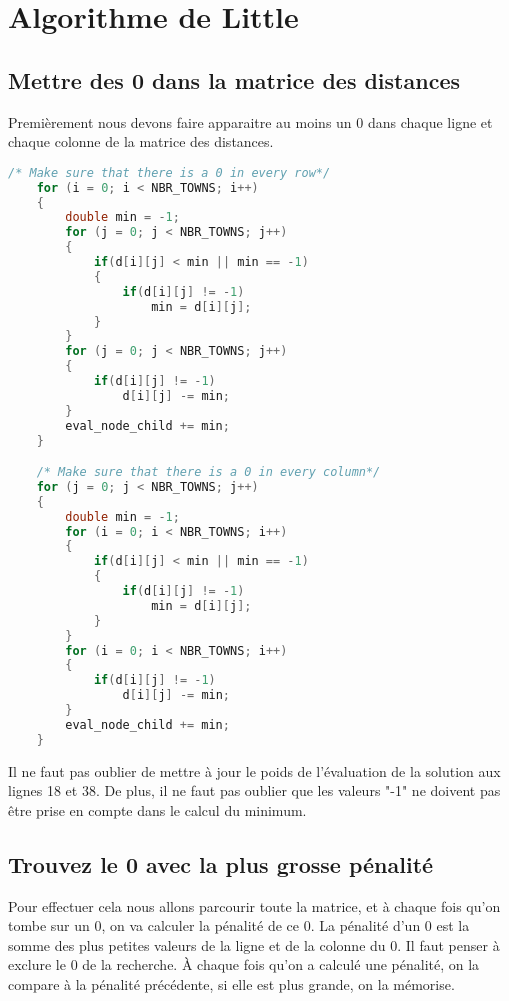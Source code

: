 \documentclass[11pt]{article}
\begin{document}
\section{Algorithme de Little}

\subsection{Mettre des 0 dans la matrice des distances}

Premièrement nous devons faire apparaitre au moins un 0 dans chaque ligne et chaque colonne de la matrice des distances.

\begin{lstlisting}[language=C]
    /* Make sure that there is a 0 in every row*/
    for (i = 0; i < NBR_TOWNS; i++)
    {
        double min = -1;
        for (j = 0; j < NBR_TOWNS; j++)
        {
            if(d[i][j] < min || min == -1)
            {
                if(d[i][j] != -1)
                    min = d[i][j];
            }
        }
        for (j = 0; j < NBR_TOWNS; j++)
        {
            if(d[i][j] != -1)
                d[i][j] -= min;
        }
        eval_node_child += min;
    }

    /* Make sure that there is a 0 in every column*/
    for (j = 0; j < NBR_TOWNS; j++)
    {
        double min = -1;
        for (i = 0; i < NBR_TOWNS; i++)
        {
            if(d[i][j] < min || min == -1)
            {
                if(d[i][j] != -1)
                    min = d[i][j];
            }
        }
        for (i = 0; i < NBR_TOWNS; i++)
        {
            if(d[i][j] != -1)
                d[i][j] -= min;
        }
        eval_node_child += min;
    }
\end{lstlisting}

Il ne faut pas oublier de mettre à jour le poids de l'évaluation de la solution aux lignes 18 et 38. De plus, il ne faut pas oublier que les valeurs "-1" ne doivent pas être prise en compte dans le calcul du minimum.

\subsection{Trouvez le 0 avec la plus grosse pénalité}

Pour effectuer cela nous allons parcourir toute la matrice, et à chaque fois qu'on tombe sur un 0, on va calculer la pénalité de ce 0. La pénalité d'un 0 est la somme des plus petites valeurs de la ligne et de la colonne du 0. Il faut penser à exclure le 0 de la recherche.
À chaque fois qu'on a calculé une pénalité, on la compare à la pénalité précédente, si elle est plus grande, on la mémorise.
\end{document}
